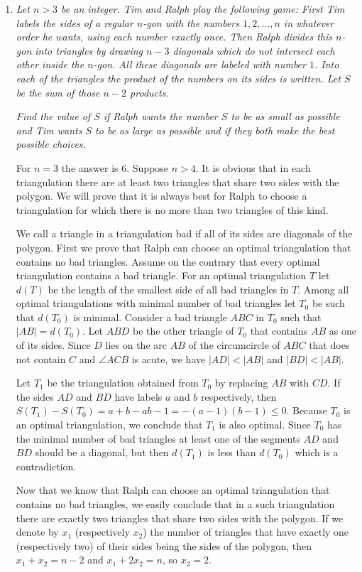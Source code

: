 \documentclass[a4paper,12pt]{article}
\begin{document}
\begin{enumerate}
	\item 
	\textit{Let $n > 3$ be an integer. Tim and Ralph play the following game: First Tim labels the sides of a regular $n$-gon with the numbers $1, 2, \dots, n$ in whatever order he wants, using each number exactly once. Then Ralph divides this $n$-gon into triangles by drawing $n-3$ diagonals which do not intersect each other inside the $n$-gon. All these diagonals are labeled with number $1$. Into each of the triangles the product of the numbers on its sides is written. Let $S$ be the sum of those $n-2$ products.}
	
	\textit{Find the value of $S$ if Ralph wants the number $S$ to be as small as possible and Tim wants $S$ to be as large as possible and if they both make the best possible choices.}
	
	For $n = 3$ the answer is 6. Suppose $n > 4$. It is obvious that in each triangulation there are at least two triangles that share two sides with the polygon. We will prove that it is always best for Ralph to choose a triangulation for which there is no more than two triangles of this kind.
	
	We call a triangle in a triangulation bad if all of its sides are diagonals of the polygon. First we prove that Ralph can choose an optimal triangulation that contains no bad triangles. Assume on the contrary that every optimal triangulation contains a bad triangle. For an optimal triangulation $T$ let $d(T)$ be the length of the smallest side of all bad triangles in $T$. Among all optimal triangulations with minimal number of bad triangles let $T_0$ be such that $d(T_0)$ is minimal. Consider a bad triangle $ABC$ in $T_0$ such that $|AB| = d(T_0)$. Let $ABD$ be the other triangle of $T_0$ that contains $AB$ as one of its sides. Since $D$ lies on the arc $AB$ of the circumcircle of $ABC$ that does not contain $C$ and $\angle ACB$ is acute, we have $|AD| < |AB|$ and $|BD| < |AB|$.
	
	Let $T_1$ be the triangulation obtained from $T_0$ by replacing $AB$ with $CD$. If the sides $AD$ and $BD$ have labels $a$ and $b$ respectively, then $S(T_1)-S(T_0) = a+b-ab-1 = -(a-1)(b-1) \leq 0$. Because $T_0$ is an optimal triangulation, we conclude that $T_1$ is also optimal. Since $T_0$ has the minimal number of bad triangles at least one of the segments $AD$ and $BD$ should be a diagonal, but then $d(T_1)$ is less than $d(T_0)$ which is a contradiction.
	
	Now that we know that Ralph can choose an optimal triangulation that contains no bad triangles, we easily conclude that in a such triangulation there are exactly two triangles that share two sides with the polygon. If we denote by $x_1$ (respectively $x_2$) the number of triangles that have exactly one (respectively two) of their sides being the sides of the polygon, then $x_1 + x_2 = n-2$ and $x_1 + 2x_2 = n$, so $x_2 = 2$.
	

\end{enumerate}
\end{document}
